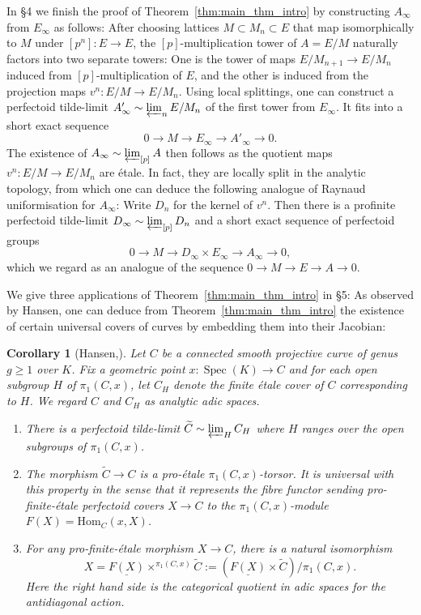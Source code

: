 \documentclass[10pt,oneside]{amsart}
\newtheorem{corollary}[theorem]{Corollary}
\theoremstyle{definition}
\newcommand{\Spec}{\operatorname{Spec}}
\begin{document}
In \S4 we finish the proof of Theorem~\ref{thm:main_thm_intro} by constructing $A_\infty$ from $E_\infty$ as follows: After choosing lattices $M\subset M_n\subset E$ that map isomorphically to $M$ under $[p^n]\colon E\rightarrow E$, the $[p]$-multiplication tower of $A=E/M$ naturally factors into two separate towers: One is the tower of maps $E/M_{n+1}\rightarrow E/M_n$ induced from $[p]$-multiplication of $E$, and the other is induced from the projection maps $v^n\colon E/M\rightarrow E/M_n$. Using local splittings, one can construct a perfectoid tilde-limit $A'_\infty\sim \varprojlim_n E/M_n$ of the first tower from $E_\infty$. It fits into a short exact sequence
\[0\to M\to E_\infty\to A'_\infty\to 0. \]
 The existence of $A_\infty\sim \varprojlim_{[p]}A$ then follows as the quotient maps $v^n\colon E/M\rightarrow E/M_n$ are \'etale. In fact, they are locally split in the analytic topology, from which one can deduce the following analogue of Raynaud uniformisation for $A_\infty$: Write $D_n$ for the kernel of $v^n$. Then there is a profinite perfectoid tilde-limit $D_\infty\sim \varprojlim_{[p]} D_n$ and a short exact sequence of perfectoid groups
\[0\rightarrow M\rightarrow D_\infty \times E_\infty \rightarrow A_\infty\rightarrow 0,\]
which we regard as an analogue of the sequence $0\rightarrow M\rightarrow E\rightarrow A\rightarrow 0$.

We give three applications of Theorem~\ref{thm:main_thm_intro} in \S 5:
As observed by Hansen, one can deduce from Theorem~\ref{thm:main_thm_intro} the existence of certain universal covers of curves by embedding them into their Jacobian:
	\begin{corollary}[Hansen,\cite{Hansen-blog}]
	Let $C$ be a connected smooth projective curve of genus $g\geq 1$ over $K$. Fix a geometric point $x\colon \Spec(K) \rightarrow C$ and for each open subgroup $H$ of $\pi_1(C,x)$, let $C_H$ denote the finite \'etale cover of $C$ corresponding to $H$. We regard $C$ and $C_H$ as analytic adic spaces.
	\begin{enumerate}
		\item There is a perfectoid tilde-limit $\widetilde{C} \sim \varprojlim_{H}C_H$ where $H$ ranges over the open subgroups of $ \pi_1(C,x)$. 
		\item The morphism $\widetilde{C}\to C$ is a pro-\'etale $\pi_1(C,x)$-torsor. It is universal with this property in the sense that it represents the fibre functor sending	 pro-finite-\'etale perfectoid covers $X\to C$ to the $\pi_1(C,x)$-module $F(X)=\mathrm{Hom}_C(x,X)$.
		\item For any pro-finite-\'etale morphism $X\to C$, there is a natural isomorphism
		\[ X = \underline{F(X)}\times^{\pi_1(C,x)}\widetilde{C}:=(\underline{F(X)}\times \widetilde{C})/\pi_1(C,x).\]
		Here the right hand side is the categorical quotient in adic spaces for the antidiagonal action.
	\end{enumerate}
\end{corollary}
\end{document}
